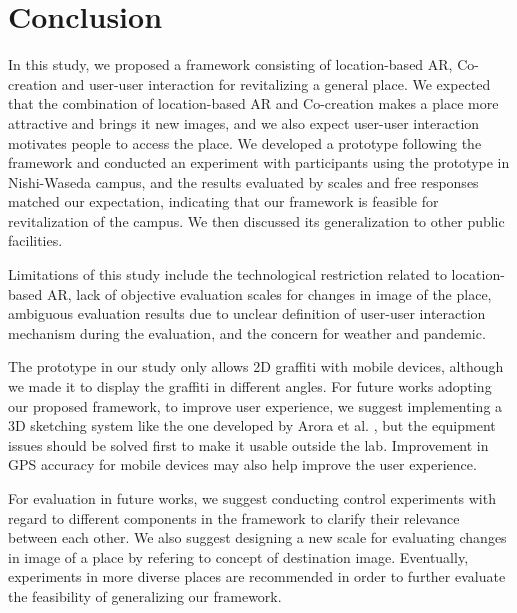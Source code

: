 \chapter{Conclusion}\label{ch:7}

In this study, we proposed a framework consisting of location-based AR, Co-creation and user-user interaction for revitalizing a general place.
We expected that the combination of location-based AR and Co-creation makes a place more attractive and brings it new images, and we also expect user-user interaction motivates people to access the place.
We developed a prototype following the framework and conducted an experiment with participants using the prototype in Nishi-Waseda campus, and the results evaluated by scales and free responses matched our expectation,
indicating that our framework is feasible for revitalization of the campus.
We then discussed its generalization to other public facilities.

Limitations of this study include the technological restriction related to location-based AR, lack of objective evaluation scales for changes in image of the place,
ambiguous evaluation results due to unclear definition of user-user interaction mechanism during the evaluation, and the concern for weather and pandemic.

The prototype in our study only allows 2D graffiti with mobile devices, although we made it to display the graffiti in different angles.
For future works adopting our proposed framework, to improve user experience, we suggest implementing a 3D sketching system like the one developed by Arora et al. \cite{arora_habib_kazi_grossman_fitzmaurice_singh_2018}, but the equipment issues should be solved first to make it usable outside the lab.
Improvement in GPS accuracy for mobile devices may also help improve the user experience.

For evaluation in future works, we suggest conducting control experiments with regard to different components in the framework to clarify their relevance between each other.
We also suggest designing a new scale for evaluating changes in image of a place by refering to concept of destination image.
Eventually, experiments in more diverse places are recommended in order to further evaluate the feasibility of generalizing our framework.